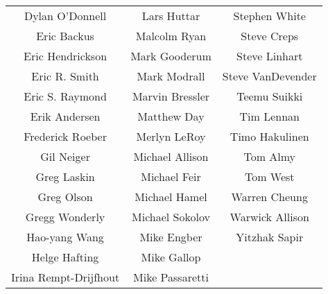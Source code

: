 \begin{center}
\begin{tabular}{ccc}
   Dylan O'Donnell    &      Lars Huttar       &   Stephen White   \\
     Eric Backus      &      Malcolm Ryan      &    Steve Creps    \\
  Eric Hendrickson    &     Mark Gooderum      &   Steve Linhart   \\
    Eric R. Smith     &      Mark Modrall      & Steve VanDevender \\
   Eric S. Raymond    &    Marvin Bressler     &    Teemu Suikki   \\
    Erik Andersen     &      Matthew Day       &     Tim Lennan    \\
  Frederick Roeber    &      Merlyn LeRoy      &   Timo Hakulinen  \\
     Gil Neiger       &    Michael Allison     &      Tom Almy     \\
     Greg Laskin      &      Michael Feir      &      Tom West     \\
     Greg Olson       &     Michael Hamel      &   Warren Cheung   \\
   Gregg Wonderly     &    Michael Sokolov     &  Warwick Allison  \\
    Hao-yang Wang     &      Mike Engber       &   Yitzhak Sapir   \\
    Helge Hafting     &      Mike Gallop       &                   \\
Irina Rempt-Drijfhout &    Mike Passaretti     &                   
\end{tabular}
\end{center}



